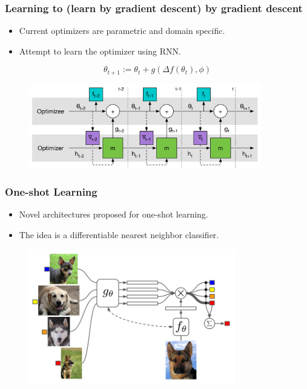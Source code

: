 \documentclass[11pt,
               hyperref={colorlinks,citecolor=pink,linkcolor=red,urlcolor=blue}
               ]{beamer}
\begin{document}
  \begin{frame}
    \frametitle{Learning to (learn by gradient descent) by gradient descent}

    \begin{itemize}
      \item Current optimizers are parametric and domain specific.
      \item Attempt to learn the optimizer using RNN.
    \end{itemize}
    \begin{equation}
      \theta_{t+1} := \theta_t + g(\Delta f(\theta_t), \phi)
    \end{equation}

    \begin{figure}
      \centering
      \includegraphics[width=0.9\textwidth]{metalearning1.png}
    \end{figure}

  \end{frame}

  \begin{frame}
    \frametitle{One-shot Learning}

    \begin{itemize}
      \item Novel architectures proposed for one-shot learning.
      \item The idea is a differentiable nearest neighbor classifier.
    \end{itemize}

    \begin{figure}
      \centering
      \includegraphics[width=0.8\textwidth]{oneshot1.png}
    \end{figure}

  \end{frame}
\end{document}
